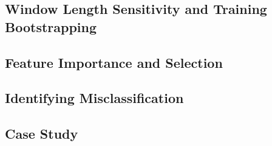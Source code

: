 \subsection{Window Length Sensitivity and Training Bootstrapping}

\subsection{Feature Importance and Selection}

\subsection{Identifying Misclassification}

\subsection{Case Study}
